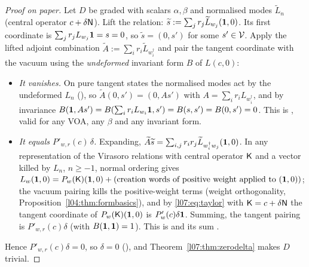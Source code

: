 \begin{proof}[Proof on paper]
Let $D$ be graded with scalars $\alpha,\beta$ and normalised modes $\widetilde L_n$ (central operator
$c+\delta\mathsf{N}$). Lift the relation: $\widetilde s := \sum_jr_j\widetilde L_{w_j}(\mathbf{1},0)$. Its first coordinate is
$\sum_jr_jL_{w_j}\mathbf{1} = s = 0$, so $\widetilde s = (0,s')$ for some $s'\in\mathcal{V}$. Apply the lifted adjoint
combination $\widetilde A := \sum_ir_i\widetilde L_{w_i^\dagger}$ and pair the tangent coordinate with the vacuum using the
\emph{undeformed} invariant form $B$ of $L(c,0)$:
\begin{itemize}
\item \emph{It vanishes.} On pure tangent states the normalised modes act by the undeformed $L_n$
  (), so $\widetilde A(0,s') = (0,As')$ with $A = \sum_ir_iL_{w_i^\dagger}$, and by
  invariance $B(\mathbf{1},As') = B(\sum_ir_iL_{w_i}\mathbf{1},s') = B(s,s') = B(0,s') = 0$. This is
  , valid for any VOA, any $\beta$ and any invariant form.
\item \emph{It equals $P'_{w,r}(c)\,\delta$.} Expanding,
  $\widetilde A\widetilde s = \sum_{i,j}r_ir_j\widetilde L_{w_i^\dagger w_j}(\mathbf{1},0)$. In any representation of the Virasoro
  relations with central operator $\mathsf{K}$ and a vector killed by $L_n$, $n\ge-1$, normal ordering gives
  $L_w(\mathbf{1},0) = P_w(\mathsf{K})(\mathbf{1},0) + (\text{creation words of positive weight applied to }(\mathbf{1},0))$; the
  vacuum pairing kills the positive-weight terms (weight orthogonality, Proposition~\ref{l04:thm:formbasics}),
  and by \eqref{l07:eq:taylor} with $\mathsf{K} = c+\delta\mathsf{N}$ the tangent coordinate of $P_w(\mathsf{K})(\mathbf{1},0)$ is
  $P_w'(c)\delta\mathbf{1}$. Summing, the tangent pairing is $P'_{w,r}(c)\delta$ (with $B(\mathbf{1},\mathbf{1}) = 1$). This is
   and its sum .
\end{itemize}
Hence $P'_{w,r}(c)\delta = 0$, so $\delta = 0$ (), and
Theorem~\ref{l07:thm:zerodelta} makes $D$ trivial.
\end{proof}

